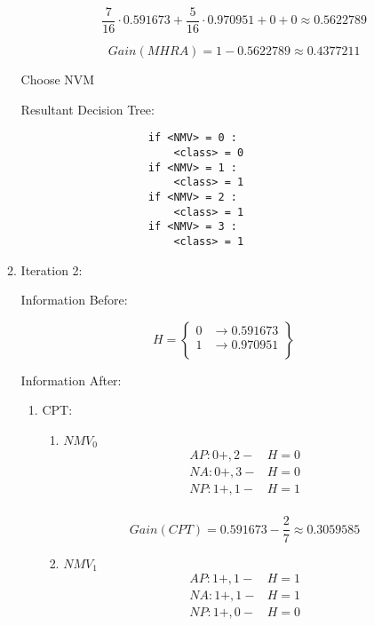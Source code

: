 \begin{enumerate}
\begin{enumerate}
\begin{enumerate}
						\[
							\frac{7}{16} \cdot 0.591673 + \frac{5}{16} \cdot 0.970951 + 0 + 0 \approx 0.5622789
						\]
						
						\[
							Gain(MHRA) = 1 - 0.5622789 \approx 0.4377211
						\]
				
				\end{enumerate}
			
				Choose NVM
				
				Resultant Decision Tree:
			
				\begin{lstlisting}
					if <NMV> = 0 :
						<class> = 0
					if <NMV> = 1 :
						<class> = 1
					if <NMV> = 2 :
						<class> = 1
					if <NMV> = 3 :
						<class> = 1
				\end{lstlisting}
			
			\item{Iteration 2:}
			
				Information Before:
				
				\[
					H = \left\{ \begin{array}{ll}
						0 & \rightarrow 0.591673 \\
						1 & \rightarrow 0.970951 \\
					\end{array} \right\}
				\]
			
				Information After:
				
				\begin{enumerate}
				
					\item{CPT:} \\
						
						\begin{enumerate}
						
							\item{\(NMV_0\)}
							\[
								\begin{array}{l|l}
									AP: 0+,2- & H= 0 \\
									NA: 0+, 3- & H= 0 \\
									NP: 1+, 1- & H = 1 \\
								\end{array}
							\] 
							
							\[
								Gain(CPT) = 0.591673 - \frac{2}{7} \approx 0.3059585
							\]
							
							\item{\(NMV_1\)}
							\[
								\begin{array}{l|l}
									AP: 1+, 1- & H= 1 \\
									NA: 1+, 1- & H= 1 \\
									NP: 1+, 0- & H = 0 \\
								\end{array}
							\] 
							

\end{enumerate}
\end{enumerate}
\end{enumerate}
\end{enumerate}
